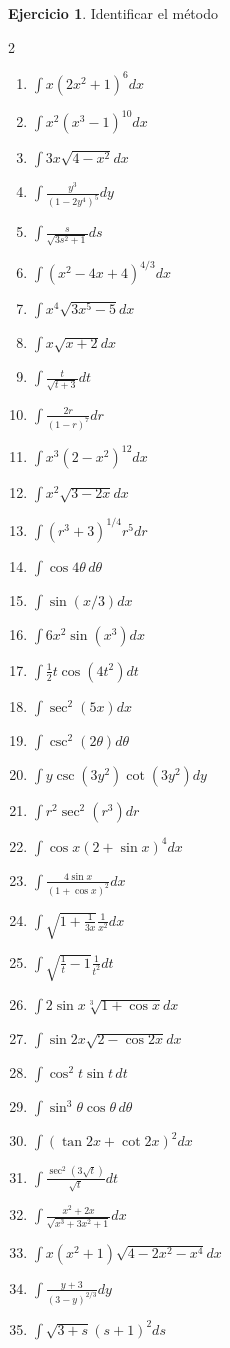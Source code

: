 \documentclass[12pt]{article}
\theoremstyle{definition}
\newtheorem{Ejer}[teorema]{Ejercicio}
\theoremstyle{remark}
\begin{document}
\begin{Ejer}{Identificar el método}
\begin{multicols}{2}
\begin{enumerate}[resume=integrales]
\item $\int x(2x^2+1)^6dx$
\item $\int x^2(x^3-1)^{10}dx$
 \item $\int3x\sqrt{4-x^2}dx$ 
 \item $\int\frac{y^3}{(1-2y^4)^5}dy$ 
 \item $\int\frac{s}{\sqrt{3s^2+1}}ds$
\item $\int(x^2-4x+4)^{4/3}dx$ 
\item $\int x^4\sqrt{3x^5-5}dx$ 
\item $\int x\sqrt{x+2}dx$ 
\item $\int\frac{t}{\sqrt{t+3}}dt$
\item $\int\frac{2r}{(1-r)^7}dr$ 
\item $\int x^3(2-x^2)^{12}dx$ 
\item $\int x^2\sqrt{3-2x}dx$ 
\item $\int(r^3+3)^{1/4}r^5dr$
\item $\int\cos4\theta\,d\theta$ 
\item $\int\sin(x/3)dx$ 
\item $\int6x^2\sin(x^3)dx$ 
\item $\int\frac12t\cos(4t^2)dt$
\item $\int\sec^2(5x)dx$ 
\item $\int\csc^2(2\theta)d\theta$ 
\item $\int y\csc(3y^2)\cot(3y^2)dy$ 
\item $\int r^2\sec^2(r^3)dr$
\item $\int\cos x(2+\sin x)^4dx$ 
\item $\int\frac{4\sin x}{(1+\cos x)^2}dx$ 
\item $\int\sqrt{1+\frac1{3x}}\frac1{x^2}dx$ 
\item $\int\sqrt{\frac1t-1}\frac1{t^2}dt$
\item $\int2\sin x\sqrt[3]{1+\cos x}dx$ 
\item $\int\sin2x\sqrt{2-\cos2x}dx$ 
\item $\int\cos^2t\sin t\,dt$ 
\item $\int\sin^3\theta\cos\theta\,d\theta$
\item $\int(\tan2x+\cot2x)^2dx$ 
\item $\int\frac{\sec^2(3\sqrt t)}{\sqrt t}dt$ 
\item $\int\frac{x^2+2x}{\sqrt{x^3+3x^2+1}}dx$ 
\item $\int x(x^2+1)\sqrt{4-2x^2-x^4}dx$
\item $\int\frac{y+3}{(3-y)^{2/3}}dy$ 
\item $\int\sqrt{3+s}(s+1)^2ds$ 

\end{enumerate}
\end{multicols}
\end{Ejer}
\end{document}
